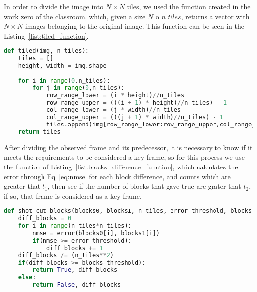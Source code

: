 \documentclass[journal]{IEEEtran}
\begin{document}
In order to divide the image into  $N\times N$ tiles, we used the function created in the work zero of the classroom, which, given a size $N$ o $n\_tiles$, returns a vector with  $N\times N$ images belonging to the original image. This function can be seen in the Listing~\ref{list:tiled_function}.
\begin{lstlisting}[language=Python, caption=Function used to split image into $N\times N$ tiles., label=list:tiled_function]
def tiled(img, n_tiles):
	tiles = []
	height, width = img.shape
	
	for i in range(0,n_tiles):
		for j in range(0,n_tiles):
			row_range_lower = (i * height)//n_tiles
			row_range_upper = (((i + 1) * height)//n_tiles) - 1
			col_range_lower = (j * width)//n_tiles
			col_range_upper = (((j + 1) * width)//n_tiles) - 1
			tiles.append(img[row_range_lower:row_range_upper,col_range_lower:col_range_upper])
	return tiles
\end{lstlisting}

After dividing the observed frame and its predecessor, it is necessary to know if it meets the requirements to be considered a key frame, so for this process we use the function of Listing~\ref{list:blocks_difference_function}, which calculates the error through Eq~\ref{eq:nmse} for each block difference, and counts which are greater that $t_1$, then see if the number of blocks that gave true are grater that $t_2$, if so, that frame is considered as a key frame.

\begin{lstlisting}[language=Python, caption=Function used to detect whether a frame is a shot change., label=list:blocks_difference_function]
def shot_cut_blocks(blocks0, blocks1, n_tiles, error_threshold, blocks_threshold):
	diff_blocks = 0
	for i in range(n_tiles*n_tiles):
		nmse = error(blocks0[i], blocks1[i])
		if(nmse >= error_threshold):
			diff_blocks += 1
	diff_blocks /= (n_tiles**2)
	if(diff_blocks >= blocks_threshold):
		return True, diff_blocks
	else:
		return False, diff_blocks
\end{lstlisting}
\end{document}
